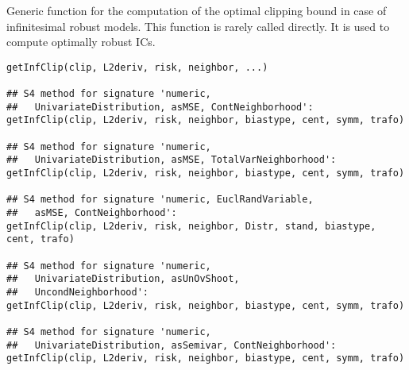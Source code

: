 \begin{Description}\relax
Generic function for the computation of the optimal clipping bound
in case of infinitesimal robust models. This function is rarely called 
directly. It is used to compute optimally robust ICs.
\end{Description}
\begin{Usage}
\begin{verbatim}
getInfClip(clip, L2deriv, risk, neighbor, ...)

## S4 method for signature 'numeric,
##   UnivariateDistribution, asMSE, ContNeighborhood':
getInfClip(clip, L2deriv, risk, neighbor, biastype, cent, symm, trafo)

## S4 method for signature 'numeric,
##   UnivariateDistribution, asMSE, TotalVarNeighborhood':
getInfClip(clip, L2deriv, risk, neighbor, biastype, cent, symm, trafo)

## S4 method for signature 'numeric, EuclRandVariable,
##   asMSE, ContNeighborhood':
getInfClip(clip, L2deriv, risk, neighbor, Distr, stand, biastype, cent, trafo)

## S4 method for signature 'numeric,
##   UnivariateDistribution, asUnOvShoot,
##   UncondNeighborhood':
getInfClip(clip, L2deriv, risk, neighbor, biastype, cent, symm, trafo)

## S4 method for signature 'numeric,
##   UnivariateDistribution, asSemivar, ContNeighborhood':
getInfClip(clip, L2deriv, risk, neighbor, biastype, cent, symm, trafo)
\end{verbatim}
\end{Usage}
